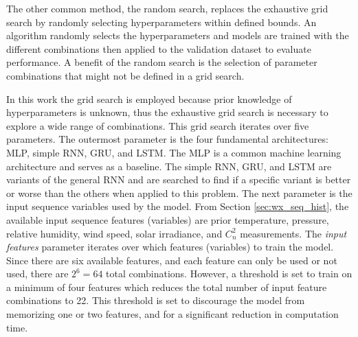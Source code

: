 The other common method, the random search, replaces the exhaustive grid search by randomly selecting hyperparameters within defined bounds. An algorithm randomly selects the hyperparameters and models are trained with the different combinations then applied to the validation dataset to evaluate performance. A benefit of the random search is the selection of parameter combinations that might not be defined in a grid search.

In this work the grid search is employed because prior knowledge of hyperparameters is unknown, thus the exhaustive grid search is necessary to explore a wide range of combinations. This grid search iterates over five parameters. The outermost parameter is the four fundamental architectures: MLP, simple RNN, GRU, and LSTM. The MLP is a common machine learning architecture and serves as a baseline. The simple RNN, GRU, and LSTM are variants of the general RNN and are searched to find if a specific variant is better or worse than the others when applied to this problem. The next parameter is the input sequence variables used by the model. From Section \ref{sec:wx_seq_hist}, the available input sequence features (variables) are prior temperature, pressure, relative humidity, wind speed, solar irradiance, and $C_{n}^{2}$ measurements. The \textit{input features} parameter iterates over which features (variables) to train the model. Since there are six available features, and each feature can only be used or not used, there are $2^6 = 64$ total combinations. However, a threshold is set to train on a minimum of four features which reduces the total number of input feature combinations to 22. This threshold is set to discourage the model from memorizing one or two features, and for a significant reduction in computation time.


